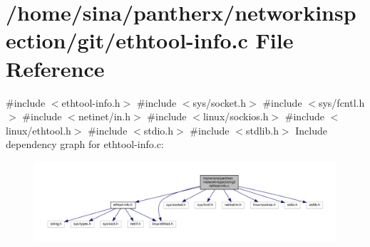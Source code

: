 \hypertarget{ethtool-info_8c}{}\section{/home/sina/pantherx/networkinspection/git/ethtool-\/info.c File Reference}
\label{ethtool-info_8c}
{\ttfamily \#include $<$ethtool-\/info.\+h$>$}\newline
{\ttfamily \#include $<$sys/socket.\+h$>$}\newline
{\ttfamily \#include $<$sys/fcntl.\+h$>$}\newline
{\ttfamily \#include $<$netinet/in.\+h$>$}\newline
{\ttfamily \#include $<$linux/sockios.\+h$>$}\newline
{\ttfamily \#include $<$linux/ethtool.\+h$>$}\newline
{\ttfamily \#include $<$stdio.\+h$>$}\newline
{\ttfamily \#include $<$stdlib.\+h$>$}\newline
Include dependency graph for ethtool-\/info.c\+:\nopagebreak
\begin{figure}[H]
\begin{center}
\leavevmode
\includegraphics[width=350pt]{ethtool-info_8c__incl}
\end{center}
\end{figure}
